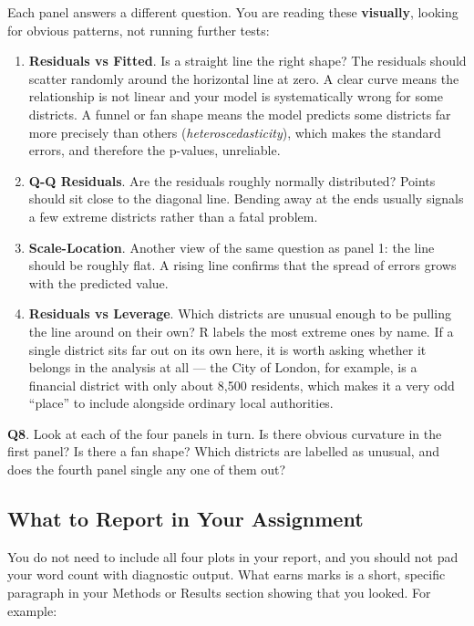 \documentclass[
  letterpaper,
  DIV=11,
  numbers=noendperiod]{scrreprt}
\begin{document}
Each panel answers a different question. You are reading these
\textbf{visually}, looking for obvious patterns, not running further
tests:

\begin{enumerate}
\def\labelenumi{\arabic{enumi}.}
\item
  \textbf{Residuals vs Fitted}. Is a straight line the right shape? The
  residuals should scatter randomly around the horizontal line at zero.
  A clear curve means the relationship is not linear and your model is
  systematically wrong for some districts. A funnel or fan shape means
  the model predicts some districts far more precisely than others
  (\emph{heteroscedasticity}), which makes the standard errors, and
  therefore the p-values, unreliable.
\item
  \textbf{Q-Q Residuals}. Are the residuals roughly normally
  distributed? Points should sit close to the diagonal line. Bending
  away at the ends usually signals a few extreme districts rather than a
  fatal problem.
\item
  \textbf{Scale-Location}. Another view of the same question as panel 1:
  the line should be roughly flat. A rising line confirms that the
  spread of errors grows with the predicted value.
\item
  \textbf{Residuals vs Leverage}. Which districts are unusual enough to
  be pulling the line around on their own? R labels the most extreme
  ones by name. If a single district sits far out on its own here, it is
  worth asking whether it belongs in the analysis at all --- the City of
  London, for example, is a financial district with only about 8,500
  residents, which makes it a very odd ``place'' to include alongside
  ordinary local authorities.
\end{enumerate}

\textbf{Q8}. Look at each of the four panels in turn. Is there obvious
curvature in the first panel? Is there a fan shape? Which districts are
labelled as unusual, and does the fourth panel single any one of them
out?

\subsection{What to Report in Your
Assignment}\label{what-to-report-in-your-assignment}

You do not need to include all four plots in your report, and you should
not pad your word count with diagnostic output. What earns marks is a
short, specific paragraph in your Methods or Results section showing
that you looked. For example:
\end{document}
